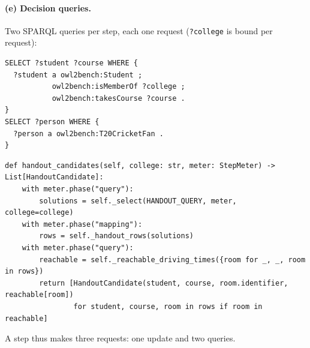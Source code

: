 \documentclass[10pt]{article}
\newcommand{\brkunderscore}{\textunderscore\allowbreak}
\newcommand{\code}[1]{{\let\_\brkunderscore\texttt{#1}}}
\begin{document}
\paragraph{(e) Decision queries.} Two SPARQL queries per step, each one request (\code{?college} is bound per request):
\begin{lstlisting}[style=sq]
SELECT ?student ?course WHERE {
  ?student a owl2bench:Student ;
           owl2bench:isMemberOf ?college ;
           owl2bench:takesCourse ?course .
}
SELECT ?person WHERE {
  ?person a owl2bench:T20CricketFan .
}
\end{lstlisting}
\begin{lstlisting}[style=py]
def handout_candidates(self, college: str, meter: StepMeter) -> List[HandoutCandidate]:
    with meter.phase("query"):
        solutions = self._select(HANDOUT_QUERY, meter, college=college)
    with meter.phase("mapping"):
        rows = self._handout_rows(solutions)
    with meter.phase("query"):
        reachable = self._reachable_driving_times({room for _, _, room in rows})
        return [HandoutCandidate(student, course, room.identifier, reachable[room])
                for student, course, room in rows if room in reachable]
\end{lstlisting}
A step thus makes three requests: one update and two queries.
\end{document}
